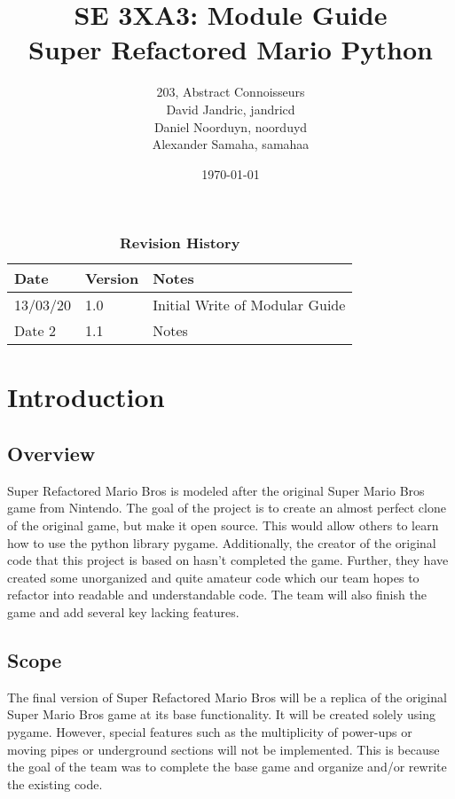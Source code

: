 \documentclass[12pt, titlepage]{article}
\title{SE 3XA3: Module Guide\\Super Refactored Mario Python}
\author{203, Abstract Connoisseurs 
		\\ David Jandric, jandricd
		\\ Daniel Noorduyn, noorduyd
		\\ Alexander Samaha, samahaa
}
\date{\today}
\begin{document}
\maketitle

\tableofcontents
\listoftables
\listoffigures

\begin{table}[btp]
\caption{\bf Revision History}
\begin{tabularx}{\textwidth}{p{3cm}p{2cm}X}
\toprule {\bf Date} & {\bf Version} & {\bf Notes}\\
\midrule
13/03/20 & 1.0 & Initial Write of Modular Guide\\
Date 2 & 1.1 & Notes\\
\bottomrule
\end{tabularx}
\end{table}

\clearpage


\section{Introduction}

\subsection{Overview}

Super Refactored Mario Bros is modeled after the original Super Mario Bros game from Nintendo. The goal of the project is to create an almost perfect clone of the original game, but make it open source. This would allow others to learn how to use the python library pygame. Additionally, the creator of the original code that this project is based on hasn't completed the game. Further, they have created some unorganized and quite amateur code which our team hopes to refactor into readable and understandable code. The team will also finish the game and add several key lacking features. 

\subsection{Scope}

The final version of Super Refactored Mario Bros will be a replica of the original Super Mario Bros game at its base functionality. It will be created solely using pygame. However, special features such as the multiplicity of power-ups or moving pipes or underground sections will not be implemented. This is because the goal of the team was to complete the base game and organize and/or rewrite the existing code.
\end{document}
